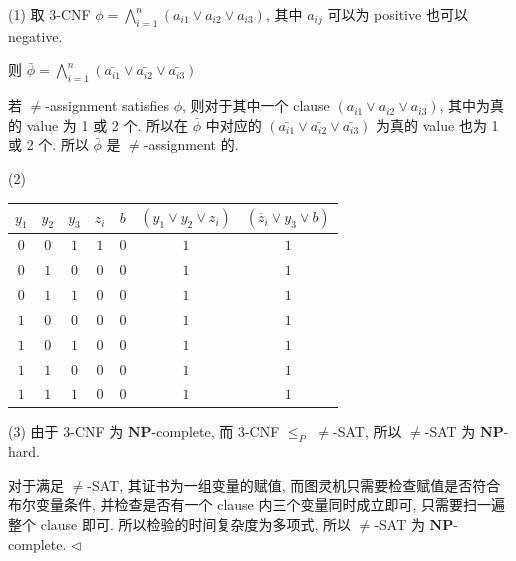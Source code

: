 \documentclass[11pt]{article}
\newcommand{\NP}{\mathbf{NP}}
\newenvironment{answer}[1][Answer]{\begin{trivlist}
		\item[\hskip \labelsep {\bfseries #1.}\hskip \labelsep]}{\hfill$\lhd$\end{trivlist}}
\begin{document}
	\begin{answer}
		(1) 取 3-CNF $\phi=\bigwedge\limits_{i=1}^{n}(a_{i1}\vee a_{i2}\vee a_{i3})$, 其中 $a_{ij}$ 可以为 positive 也可以 negative.
		
		则 $\bar{\phi}=\bigwedge\limits_{i=1}^{n}(\bar{a_{i1}}\vee\bar{a_{i2}}\vee\bar{a_{i3}})$
		
		若 $\neq$-assignment satisfies $\phi$, 则对于其中一个 clause $(a_{i1}\vee a_{i2}\vee a_{i3})$, 其中为真的 value 为 1 或 2 个. 所以在 $\bar{\phi}$ 中对应的 $(\bar{a_{i1}}\vee\bar{a_{i2}}\vee\bar{a_{i3}})$ 为真的 value 也为 1 或 2 个. 所以 $\bar{\phi}$ 是 $\neq$-assignment 的.
		
		(2) \begin{table}[H]
			\centering
			\begin{tabular}{|c|c|c|c|c|c|c|} \hline
				$y_1$ & $y_2$ & $y_3$ & $z_i$ & $b$ & $(y_1 \lor y_2 \lor z_i)$ & $(\overline{z}_i \lor y_3 \lor b)$ \\ \hline 
				$0$ & $0$ & $1$ & $1$ & $0$ & $1$ & $1$ \\ \hline 
				$0$ & $1$ & $0$ & $0$ & $0$ & $1$ & $1$ \\ \hline 
				$0$ & $1$ & $1$ & $0$ & $0$ & $1$ & $1$ \\ \hline 
				$1$ & $0$ & $0$ & $0$ & $0$ & $1$ & $1$ \\ \hline 
				$1$ & $0$ & $1$ & $0$ & $0$ & $1$ & $1$ \\ \hline 
				$1$ & $1$ & $0$ & $0$ & $0$ & $1$ & $1$ \\ \hline 
				$1$ & $1$ & $1$ & $0$ & $0$ & $1$ & $1$ \\ \hline 
			\end{tabular}
		\end{table}
		
		(3) 由于 3-CNF 为 $\NP$-complete, 而 3-CNF $\leq_P$ $\neq$-SAT, 所以 $\neq$-SAT 为 $\NP$-hard.
		
		对于满足 $\neq$-SAT, 其证书为一组变量的赋值, 而图灵机只需要检查赋值是否符合布尔变量条件, 并检查是否有一个 clause 内三个变量同时成立即可, 只需要扫一遍整个 clause 即可. 所以检验的时间复杂度为多项式, 所以 $\neq$-SAT 为 $\NP$-complete.
	\end{answer}
\end{document}
